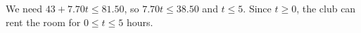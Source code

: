 We need $43+7.70t\le81.50$, so $7.70t\le38.50$ and $t\le5$. Since $t\ge0$, the club can rent the room for $\boxed{0\le t\le5}$ hours.
